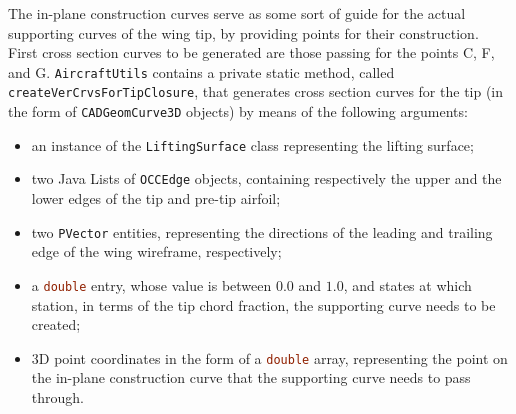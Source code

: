 \bigskip
\noindent
The in-plane construction curves serve as some sort of guide for the actual supporting curves of the wing tip, by providing points for their construction. First cross section curves to be generated are those passing for the points C, F, and G. \lstinline[language=Java]!AircraftUtils! contains a private static method, called \lstinline[language=Java]!createVerCrvsForTipClosure!, that generates cross section curves for the tip (in the form of \lstinline[language=Java]!CADGeomCurve3D! objects) by means of the following arguments:
%
\begin{itemize}
\item an instance of the \lstinline[language=Java]!LiftingSurface! class representing the lifting surface;
\item two Java \gls{List}s of \lstinline[language=Java]!OCCEdge! objects, containing respectively the upper and the lower edges of the tip and pre-tip airfoil;
\item two \lstinline[language=Java]!PVector! entities, representing the directions of the leading and trailing edge of the wing wireframe, respectively;
\item a \lstinline[language=Java]!double! entry, whose value is between $0.0$ and $1.0$, and states at which station, in terms of the tip chord fraction, the supporting curve needs to be created;
\item 3D point coordinates in the form of a \lstinline[language=Java]!double! array, representing the point on the in-plane construction curve that the supporting curve needs to pass through.
\end{itemize}
%
